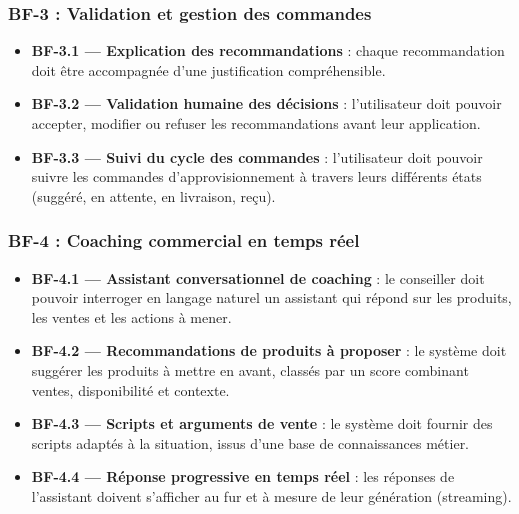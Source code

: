 \subsubsection*{BF-3 : Validation et gestion des commandes}
\begin{itemize}[label=--]
    \item \textbf{BF-3.1 — Explication des recommandations} : chaque recommandation doit être accompagnée d'une justification compréhensible.
    \item \textbf{BF-3.2 — Validation humaine des décisions} : l'utilisateur doit pouvoir accepter, modifier ou refuser les recommandations avant leur application.
    \item \textbf{BF-3.3 — Suivi du cycle des commandes} : l'utilisateur doit pouvoir suivre les commandes d'approvisionnement à travers leurs différents états (suggéré, en attente, en livraison, reçu).
\end{itemize}

\subsubsection*{BF-4 : Coaching commercial en temps réel}
\begin{itemize}[label=--]
    \item \textbf{BF-4.1 — Assistant conversationnel de coaching} : le conseiller doit pouvoir interroger en langage naturel un assistant qui répond sur les produits, les ventes et les actions à mener.
    \item \textbf{BF-4.2 — Recommandations de produits à proposer} : le système doit suggérer les produits à mettre en avant, classés par un score combinant ventes, disponibilité et contexte.
    \item \textbf{BF-4.3 — Scripts et arguments de vente} : le système doit fournir des scripts adaptés à la situation, issus d'une base de connaissances métier.
    \item \textbf{BF-4.4 — Réponse progressive en temps réel} : les réponses de l'assistant doivent s'afficher au fur et à mesure de leur génération (streaming).
\end{itemize}

